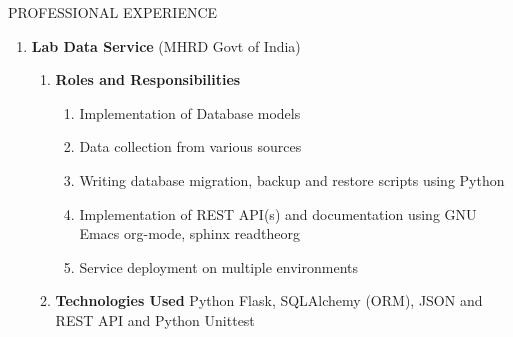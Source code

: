\documentclass{resume} %
\newcommand{\blank}[1]{\hspace*{#1}}
\begin{document}
\begin{rSection}{PROFESSIONAL EXPERIENCE}
\begin{rSubsection}
\begin{enumerate}[label=\bfseries\arabic*]
\item \textbf {Lab Data Service} (MHRD Govt of India)
  \begin{enumerate}
  \item \textbf{Roles and Responsibilities }
    \begin{enumerate}
    \item Implementation of Database models
    \item Data collection from various sources
    \item Writing database migration, backup and restore scripts using
      Python
    \item Implementation of REST API(s) and documentation
      using GNU Emacs org-mode, sphinx readtheorg
    \item Service deployment on multiple environments
    \end{enumerate}
  \item \textbf{Technologies Used } Python Flask, SQLAlchemy
    (ORM), JSON and REST API and Python Unittest
  \end{enumerate}



\end{enumerate}
\end{rSubsection}

\end{rSection}


\end{document}

